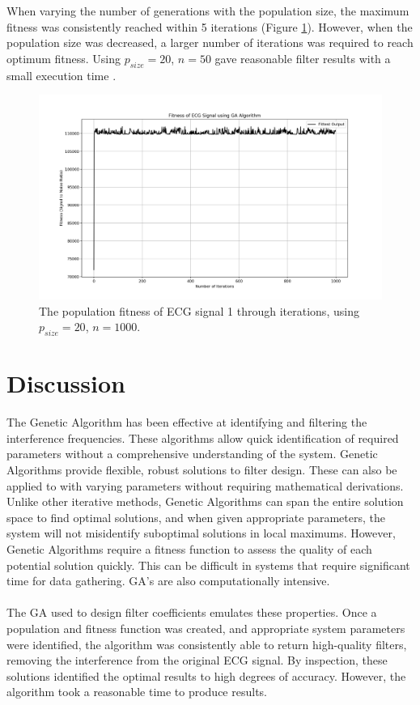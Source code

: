 \documentclass[a4paper, 11pt]{article}
\begin{document}
    When varying the number of generations with the population size, the maximum fitness was consistently reached within 5 
    iterations (Figure \ref{Fig:result_2}). However, when the population size was decreased, a larger number of
    iterations was required to reach optimum fitness. Using $p_{size} = 20$, $n = 50$ gave reasonable filter results with a
    small execution time \cite[]{Garip2018}.

    \begin{figure}[h!]
        \centering
        \graphicspath{{./wiki/}}
        \includegraphics[scale=0.5]{1kGen20Pop.png}
        \caption{The population fitness of ECG signal 1 through iterations, using $p_{size} = 20$, $n = 1000$.}
        \label{Fig:result_2}
    \end{figure}

\section{Discussion}\label{sec:dis}
    The Genetic Algorithm has been effective at identifying and filtering the interference frequencies. These algorithms 
    allow quick identification of required parameters without a comprehensive understanding of the system. Genetic Algorithms 
    provide flexible, robust solutions to filter design. These can also be applied to with varying parameters without requiring
    mathematical derivations. Unlike other iterative methods, Genetic Algorithms can span the entire solution space to find
    optimal solutions, and when given appropriate parameters, the system will not misidentify suboptimal solutions in local
    maximums. However, Genetic Algorithms require a fitness function to assess the quality of each potential solution quickly. 
    This can be difficult in systems that require significant time for data gathering. GA's are also computationally intensive.
    \\\\
    The GA used to design filter coefficients emulates these properties. Once a population and fitness function was created,
    and appropriate system parameters were identified, the algorithm was consistently able to return high-quality filters, 
    removing the interference from the original ECG signal. By inspection, these solutions identified the optimal results to
    high degrees of accuracy. However, the algorithm took a reasonable time to produce results.
\end{document}

